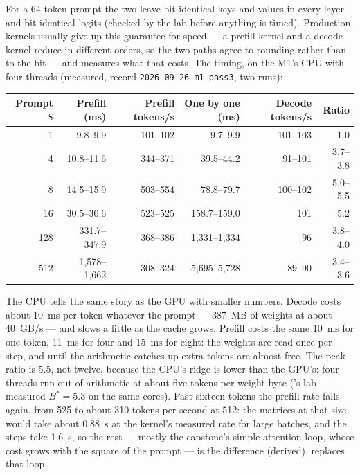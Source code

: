 
\noindent For a 64-token prompt the two leave bit-identical keys and values in
every layer and bit-identical logits (checked by the lab before anything is
timed). Production kernels usually give up this guarantee for speed ---
a prefill kernel and a decode kernel reduce in different orders, so the two
paths agree to rounding rather than to the bit --- and 
measures what that costs. The timing, on the M1's CPU with four threads
(measured, record \texttt{2026-09-26-m1-pass3}, two runs):

\begin{center}\small
\begin{tabular}{@{}rrrrrr@{}}
\toprule
Prompt $S$ & Prefill (ms) & Prefill tokens/s & One by one (ms) & Decode tokens/s & Ratio \\
\midrule
1 & 9.8--9.9 & 101--102 & 9.7--9.9 & 101--103 & 1.0 \\
4 & 10.8--11.6 & 344--371 & 39.5--44.2 & 91--101 & 3.7--3.8 \\
8 & 14.5--15.9 & 503--554 & 78.8--79.7 & 100--102 & 5.0--5.5 \\
16 & 30.5--30.6 & 523--525 & 158.7--159.0 & 101 & 5.2 \\
128 & 331.7--347.9 & 368--386 & 1{,}331--1{,}334 & 96 & 3.8--4.0 \\
512 & 1{,}578--1{,}662 & 308--324 & 5{,}695--5{,}728 & 89--90 & 3.4--3.6 \\
\bottomrule
\end{tabular}
\end{center}

\noindent The CPU tells the same story as the GPU with smaller numbers.
Decode costs about 10~ms per token whatever the prompt --- 387~MB of weights at
about 40~GB/s --- and slows a little as the cache grows. Prefill costs the same
10~ms for one token, 11~ms for four and 15~ms for eight: the weights are read
once per step, and until the arithmetic catches up extra tokens are almost
free. The peak ratio is 5.5, not twelve, because the CPU's ridge is lower than
the GPU's: four threads run out of arithmetic at about five tokens per weight
byte ('s lab measured $B^{*} = 5.3$ on the same cores). Past
sixteen tokens the prefill rate falls again, from 525 to about 310 tokens per
second at 512: the matrices at that size would take about 0.88~s at the kernel's
measured rate for large batches, and the steps take 1.6~s, so the rest ---
mostly the capstone's simple attention loop, whose cost grows with the square of
the prompt --- is the difference (derived).  replaces that
loop.

